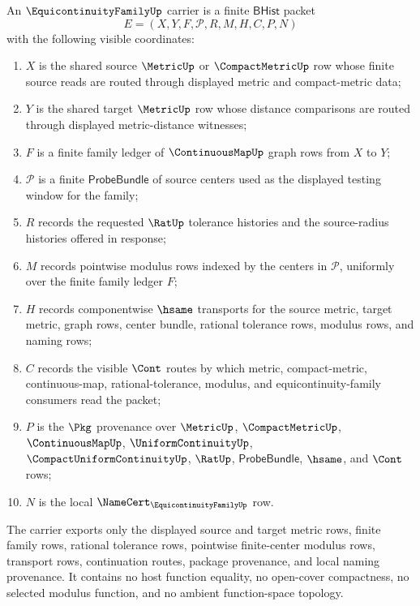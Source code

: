 \begin{definition}
\label{def:equicontinuity-family-carrier}
An $\EquicontinuityFamilyUp$ carrier is a finite $\mathsf{BHist}$ packet
$$
E=(X,Y,F,\mathcal{P},R,M,H,C,P,N)
$$
with the following visible coordinates:
\begin{enumerate}
\item $X$ is the shared source $\MetricUp$ or $\CompactMetricUp$ row whose
finite source reads are routed through displayed metric and compact-metric
data;
\item $Y$ is the shared target $\MetricUp$ row whose distance comparisons
are routed through displayed metric-distance witnesses;
\item $F$ is a finite family ledger of $\ContinuousMapUp$ graph rows from
$X$ to $Y$;
\item $\mathcal{P}$ is a finite $\mathsf{ProbeBundle}$ of source centers
used as the displayed testing window for the family;
\item $R$ records the requested $\RatUp$ tolerance histories and the
source-radius histories offered in response;
\item $M$ records pointwise modulus rows indexed by the centers in
$\mathcal{P}$, uniformly over the finite family ledger $F$;
\item $H$ records componentwise $\hsame$ transports for the source metric,
target metric, graph rows, center bundle, rational tolerance rows, modulus
rows, and naming rows;
\item $C$ records the visible $\Cont$ routes by which metric,
compact-metric, continuous-map, rational-tolerance, modulus, and
equicontinuity-family consumers read the packet;
\item $P$ is the $\Pkg$ provenance over $\MetricUp$, $\CompactMetricUp$,
$\ContinuousMapUp$, $\UniformContinuityUp$,
$\CompactUniformContinuityUp$, $\RatUp$, $\mathsf{ProbeBundle}$,
$\hsame$, and $\Cont$ rows;
\item $N$ is the local $\NameCert_{\EquicontinuityFamilyUp}$ row.
\end{enumerate}
The carrier exports only the displayed source and target metric rows, finite
family rows, rational tolerance rows, pointwise finite-center modulus rows,
transport rows, continuation routes, package provenance, and local naming
provenance. It contains no host function equality, no open-cover
compactness, no selected modulus function, and no ambient function-space
topology.
\end{definition}

